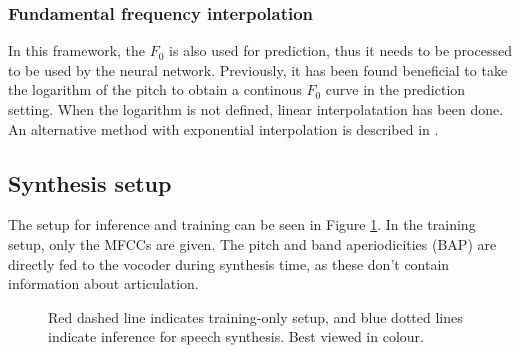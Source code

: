 \documentclass[a4paper]{article}
\begin{document}
\subsubsection{Fundamental frequency interpolation}

In this framework, the \( F_0 \) is also used for prediction, thus it
needs to be processed to be used by the neural network. 
Previously, it has been found beneficial to take the logarithm of the
pitch to obtain a continous \( F_0 \) curve in the prediction setting.
When the logarithm is not defined, linear  interpolatation has been done. \cite{Gonzalez2017}
An alternative method with exponential interpolation is described in \cite{Chen1997}.

\subsection{Synthesis setup}

The setup for inference and training can be seen in Figure \ref{fig:structure}.
In the training setup, only the MFCCs are given.
The pitch and band aperiodicities (BAP) are directly fed to the vocoder
during synthesis time, as these don't contain information about articulation. 

\begin{figure}
  \caption{Red dashed line indicates training-only setup, and blue dotted lines indicate inference for speech synthesis. Best viewed in colour.}
  \label{fig:structure}
\end{figure}
\end{document}
